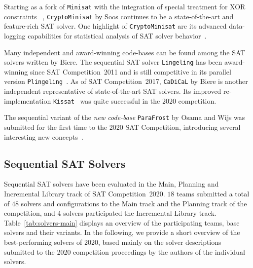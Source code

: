 \documentclass{elsarticle}
\newcommand{\solver}[1]{\texttt{#1}}
\begin{document}
Starting as a fork of \solver{Minisat} with the integration of special treatment for XOR constraints ~\cite{Soos:2009:Crypto},
\solver{CryptoMinisat} by Soos continues to be a state-of-the-art and feature-rich SAT solver. 
One highlight of \solver{CryptoMinisat} are its advanced data-logging capabilities for statistical analysis of SAT solver behavior~\cite{Soos:2019:ChrystalBall}.

Many independent and award-winning code-bases can be found among the SAT solvers written by Biere. 
The sequential SAT solver \solver{Lingeling} has been award-winning since SAT Competition~2011 and is still competitive in its parallel version \solver{Plingeling}~\cite{Biere:2012:Lingeling}. 
As of SAT Competition~2017, \solver{CaDiCaL} %
by Biere is another independent representative of state-of-the-art SAT solvers.
Its improved re-implementation \solver{Kissat}~\cite{Biere:SC2020} was quite successful in the 2020 competition.

The sequential variant of the \emph{new code-base} \solver{ParaFrost} by Osama and Wijs was submitted for the first time to the 2020 SAT Competition,
 introducing several interesting new concepts~\cite{Osama:SC2020:Parafrost}. 


\subsection{Sequential SAT Solvers}
\label{sec:part:seq}

Sequential SAT solvers have been evaluated in the Main, Planning and Incremental Library track of SAT Competition~2020. 
$18$ teams submitted a total of $48$ solvers and configurations to the Main track and the Planning track of the competition, and $4$ solvers participated the Incremental Library track. 
%
Table~\ref{tab:solvers-main} displays an overview of the participating teams, base solvers and their variants. 
In the following, we provide a short overview of the best-performing solvers of 2020, based mainly on the solver descriptions submitted
to the 2020 competition proceedings by the authors of the individual solvers.
\end{document}
